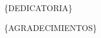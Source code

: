 
    
        \vspace*{20 mm}
        \{DEDICATORIA\}%
        
        \bigskip
        
        \{AGRADECIMIENTOS\}%
        
    \vspace*{\fill}
    
    \newpage  
